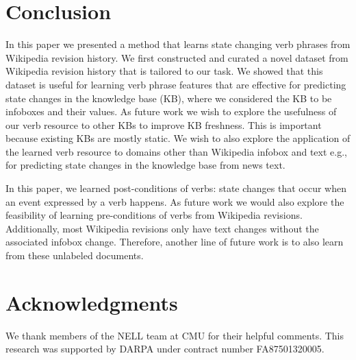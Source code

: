\section{Conclusion}
In this paper we presented a method that learns state changing verb phrases from Wikipedia revision history.
We first constructed and curated a novel dataset from Wikipedia revision history that is tailored to our task.  We showed that this dataset is useful for learning verb phrase features that are effective for predicting state changes in the knowledge base (KB), where we considered the KB to be infoboxes and their values. As future work we wish to explore the usefulness of  our verb resource to other KBs to improve KB freshness. This is important because existing KBs are mostly static. We wish to also explore the application of the learned verb resource to domains other than Wikipedia infobox and text e.g., for predicting state changes in the knowledge base from news text. 

 In this paper, we learned   post-conditions of verbs: state changes that  occur  when an event expressed by a verb happens. As  future work we would also   explore the feasibility of learning  pre-conditions of verbs from  Wikipedia revisions. Additionally, most Wikipedia revisions only have text changes without the associated infobox change. Therefore,  another line of future work is to also learn from these unlabeled documents.


\section*{Acknowledgments}
We thank members of the NELL team at CMU for their helpful comments.
This research was supported by
DARPA under contract number FA87501320005. 